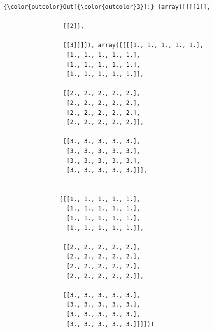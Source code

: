 \documentclass[11pt]{article}
\begin{document}
\begin{Verbatim}[commandchars=\\\{\}]
{\color{outcolor}Out[{\color{outcolor}3}]:} (array([[[[1]],
         
                 [[2]],
         
                 [[3]]]]), array([[[[1., 1., 1., 1., 1.],
                  [1., 1., 1., 1., 1.],
                  [1., 1., 1., 1., 1.],
                  [1., 1., 1., 1., 1.]],
         
                 [[2., 2., 2., 2., 2.],
                  [2., 2., 2., 2., 2.],
                  [2., 2., 2., 2., 2.],
                  [2., 2., 2., 2., 2.]],
         
                 [[3., 3., 3., 3., 3.],
                  [3., 3., 3., 3., 3.],
                  [3., 3., 3., 3., 3.],
                  [3., 3., 3., 3., 3.]]],
         
         
                [[[1., 1., 1., 1., 1.],
                  [1., 1., 1., 1., 1.],
                  [1., 1., 1., 1., 1.],
                  [1., 1., 1., 1., 1.]],
         
                 [[2., 2., 2., 2., 2.],
                  [2., 2., 2., 2., 2.],
                  [2., 2., 2., 2., 2.],
                  [2., 2., 2., 2., 2.]],
         
                 [[3., 3., 3., 3., 3.],
                  [3., 3., 3., 3., 3.],
                  [3., 3., 3., 3., 3.],
                  [3., 3., 3., 3., 3.]]]]))
\end{Verbatim}
            
\end{document}
